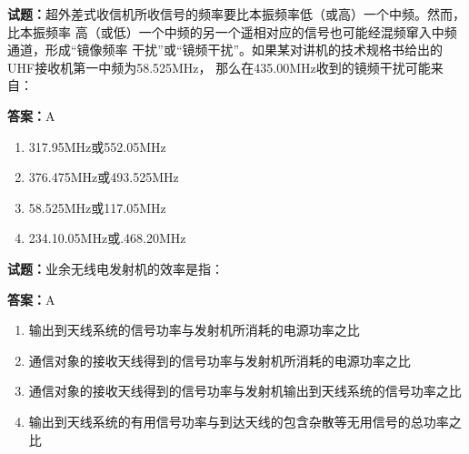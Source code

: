 \documentclass{ctexbook}
\begin{document}


\vspace{1em}

\textbf{试题：}超外差式收信机所收信号的频率要比本振频率低（或高）一个中频。然而，比本振频率
高（或低）一个中频的另一个遥相对应的信号也可能经混频窜入中频通道，形成“镜像频率
干扰”或“镜频干扰”。如果某对讲机的技术规格书给出的UHF接收机第一中频为58.525MHz，
那么在435.00MHz收到的镜频干扰可能来自： 

\textbf{答案：}A 

\begin{enumerate}[leftmargin=3em]
  \item 317.95MHz或552.05MHz 

  \item 376.475MHz或493.525MHz 

  \item 58.525MHz或117.05MHz 

  \item 234.10.05MHz或.468.20MHz 

\end{enumerate}





\vspace{1em}

\textbf{试题：}业余无线电发射机的效率是指： 

\textbf{答案：}A 

\begin{enumerate}[leftmargin=3em]
  \item 输出到天线系统的信号功率与发射机所消耗的电源功率之比 

  \item 通信对象的接收天线得到的信号功率与发射机所消耗的电源功率之比 

  \item 通信对象的接收天线得到的信号功率与发射机输出到天线系统的信号功率之比 

  \item 输出到天线系统的有用信号功率与到达天线的包含杂散等无用信号的总功率之比 

\end{enumerate}





\vspace{1em}
\end{document}
